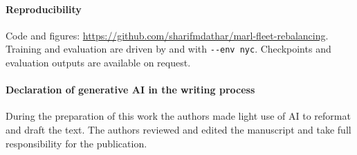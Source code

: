 \documentclass[3p,times,procedia]{elsarticle}
\begin{document}
\paragraph{Reproducibility}
Code and figures: \url{https://github.com/sharifmdathar/marl-fleet-rebalancing}. Training and evaluation are driven by  and  with \texttt{-{}-env nyc}. Checkpoints and evaluation outputs are available on request.

\paragraph{Declaration of generative AI in the writing process}
During the preparation of this work the authors made light use of AI to reformat and draft the text. The authors reviewed and edited the manuscript and take full responsibility for the publication.
\end{document}
